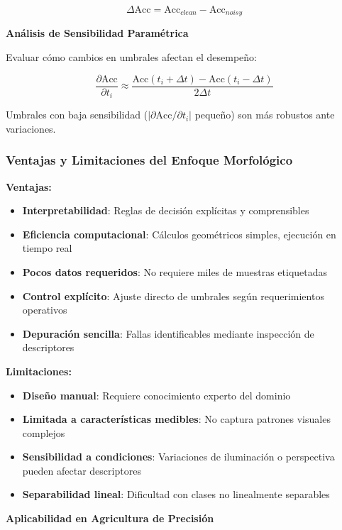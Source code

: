 \begin{equation}
\Delta\text{Acc} = \text{Acc}_{clean} - \text{Acc}_{noisy}
\end{equation}

\textbf{Análisis de Sensibilidad Paramétrica}

Evaluar cómo cambios en umbrales afectan el desempeño:

\begin{equation}
\frac{\partial \text{Acc}}{\partial t_i} \approx \frac{\text{Acc}(t_i + \Delta t) - \text{Acc}(t_i - \Delta t)}{2\Delta t}
\end{equation}

Umbrales con baja sensibilidad ($|\partial \text{Acc}/\partial t_i|$ pequeño) son más robustos ante variaciones.

\subsubsection{Ventajas y Limitaciones del Enfoque Morfológico}

\textbf{Ventajas:}
\begin{itemize}
\item \textbf{Interpretabilidad}: Reglas de decisión explícitas y comprensibles
\item \textbf{Eficiencia computacional}: Cálculos geométricos simples, ejecución en tiempo real
\item \textbf{Pocos datos requeridos}: No requiere miles de muestras etiquetadas
\item \textbf{Control explícito}: Ajuste directo de umbrales según requerimientos operativos
\item \textbf{Depuración sencilla}: Fallas identificables mediante inspección de descriptores
\end{itemize}

\textbf{Limitaciones:}
\begin{itemize}
\item \textbf{Diseño manual}: Requiere conocimiento experto del dominio
\item \textbf{Limitada a características medibles}: No captura patrones visuales complejos
\item \textbf{Sensibilidad a condiciones}: Variaciones de iluminación o perspectiva pueden afectar descriptores
\item \textbf{Separabilidad lineal}: Dificultad con clases no linealmente separables
\end{itemize}

\textbf{Aplicabilidad en Agricultura de Precisión}

